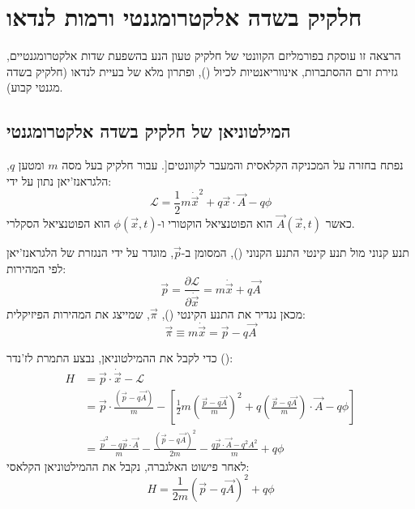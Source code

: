 \section{ חלקיק בשדה אלקטרומגנטי ורמות לנדאו}

הרצאה זו עוסקת בפורמליזם הקוונטי של חלקיק טעון הנע בהשפעת שדות אלקטרומגנטיים, גזירת זרם ההסתברות, אינווריאנטיות לכיול (), ופתרון מלא של בעיית לנדאו (חלקיק בשדה מגנטי קבוע).

\subsection{המילטוניאן של חלקיק בשדה אלקטרומגנטי}

נפתח בחזרה על המכניקה הקלאסית והמעבר לקוונטים[. עבור חלקיק בעל מסה $m$ ומטען $q$, הלגראנז'יאן נתון על ידי:
\begin{equation}
\mathcal{L} = \frac{1}{2}m\dot{\vec{x}}^2 + q\vec{x}\cdot\vec{A} - q\phi
\end{equation}
כאשר $\vec{A}(\vec{x},t)$ הוא הפוטנציאל הוקטורי ו-$\phi(\vec{x},t)$ הוא הפוטנציאל הסקלרי.

\begin{definitionbox}{תנע קנוני מול תנע קינטי}
התנע הקנוני (), המסומן ב-$\vec{p}$, מוגדר על ידי הנגזרת של הלגראנז'יאן לפי המהירות:
\begin{equation}
\vec{p} = \frac{\partial \mathcal{L}}{\partial \dot{\vec{x}}} = m\dot{\vec{x}} + q\vec{A}
\end{equation}
מכאן נגדיר את התנע הקינטי (), $\vec{\pi}$, שמייצג את המהירות הפיזיקלית:
\begin{equation}
\vec{\pi} \equiv m\dot{\vec{x}} = \vec{p} - q\vec{A}
\end{equation}
\end{definitionbox}

כדי לקבל את ההמילטוניאן, נבצע התמרת לז'נדר ():
\begin{align}
H &= \vec{p}\cdot\dot{\vec{x}} - \mathcal{L} \nonumber \\
&= \vec{p}\cdot\frac{(\vec{p}-q\vec{A})}{m} - \left[ \frac{1}{2}m\left(\frac{\vec{p}-q\vec{A}}{m}\right)^2 + q\left(\frac{\vec{p}-q\vec{A}}{m}\right)\cdot\vec{A} - q\phi \right] \nonumber \\
&= \frac{\vec{p}^2 - q\vec{p}\cdot\vec{A}}{m} - \frac{(\vec{p}-q\vec{A})^2}{2m} - \frac{q\vec{p}\cdot\vec{A} - q^2 A^2}{m} + q\phi
\end{align}
לאחר פישוט האלגברה, נקבל את ההמילטוניאן הקלאסי:
\begin{equation}
H = \frac{1}{2m}\left(\vec{p} - q\vec{A}\right)^2 + q\phi
\end{equation}

